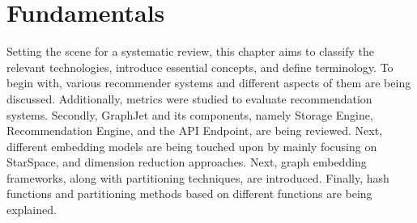 \chapter{Fundamentals}

Setting the scene for a systematic review, this chapter aims to classify the relevant technologies, introduce essential concepts, and define terminology. To begin with, various recommender systems and different aspects of them are being discussed. Additionally, metrics were studied to evaluate recommendation systems. Secondly, GraphJet and its components, namely Storage Engine, Recommendation Engine, and the API Endpoint, are being reviewed. Next, different embedding models are being touched upon by mainly focusing on StarSpace, and dimension reduction approaches. Next, graph embedding frameworks, along with partitioning techniques, are introduced. Finally, hash functions and partitioning methods based on different functions are being explained.
